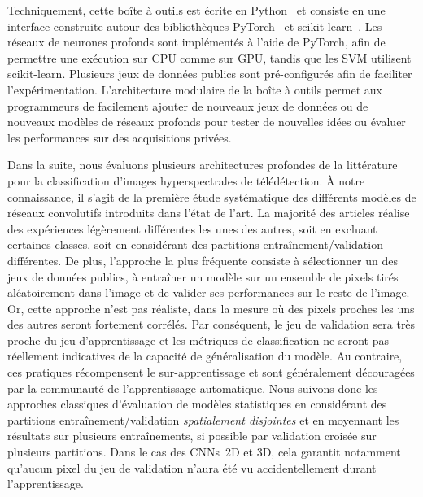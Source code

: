 
Techniquement, cette boîte à outils est écrite en Python~\cite{python_software_foundation_python_nodate} et consiste en une interface construite autour des bibliothèques \gls{PyTorch}~\cite{noauthor_pytorch_2016} et \gls{scikit-learn}~\cite{pedregosa_scikit-learn_2011}. Les réseaux de neurones profonds sont implémentés à l'aide de \gls{PyTorch}, afin de permettre une exécution sur \gls{CPU} comme sur \gls{GPU}, tandis que les \gls{SVM} utilisent \gls{scikit-learn}. Plusieurs jeux de données publics sont pré-configurés afin de faciliter l'expérimentation. L'architecture modulaire de la boîte à outils permet aux programmeurs de facilement ajouter de nouveaux jeux de données ou de nouveaux modèles de réseaux profonds pour tester de nouvelles idées ou évaluer les performances sur des acquisitions privées.

Dans la suite, nous évaluons plusieurs architectures profondes de la littérature pour la classification d'images hyperspectrales de télédétection. À notre connaissance, il s'agit de la première étude systématique des différents modèles de réseaux convolutifs introduits dans l'état de l'art. La majorité des articles réalise des expériences légèrement différentes les unes des autres, soit en excluant certaines classes, soit en considérant des partitions entraînement/validation différentes. De plus, l'approche la plus fréquente consiste à sélectionner un des jeux de données publics, à entraîner un modèle sur un ensemble de pixels tirés aléatoirement dans l'image et de valider ses performances sur le reste de l'image. Or, cette approche n'est pas réaliste, dans la mesure où des pixels proches les uns des autres seront fortement corrélés. Par conséquent, le jeu de validation sera très proche du jeu d'apprentissage et les métriques de classification ne seront pas réellement indicatives de la capacité de généralisation du modèle. Au contraire, ces pratiques récompensent le sur-apprentissage et sont généralement découragées par la communauté de l'apprentissage automatique. Nous suivons donc les approches classiques d'évaluation de modèles statistiques en considérant des partitions entraînement/validation \emph{spatialement disjointes} et en moyennant les résultats sur plusieurs entraînements, si possible par validation croisée sur plusieurs partitions. Dans le cas des \glspl{CNN}~2D et 3D, cela garantit notamment qu'aucun pixel du jeu de validation n'aura été vu accidentellement durant l'apprentissage.

